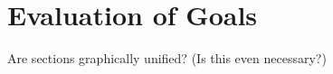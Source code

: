 

\section{Evaluation of Goals} %
\label{sec:evaluation_of_goals}
	Are sections graphically unified? (Is this even necessary?)






